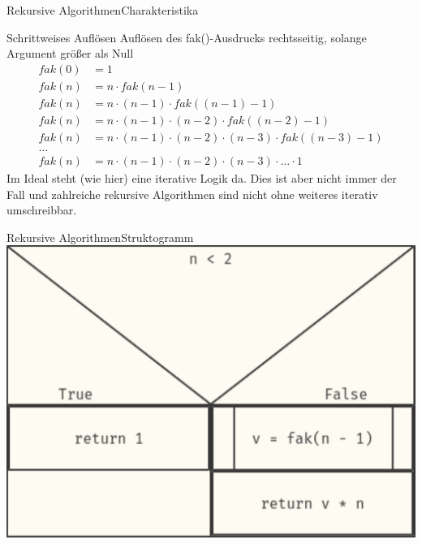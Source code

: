 \documentclass[xelatex,aspectratio=169]{beamer}
\begin{document}
\begin{frame}{Rekursive Algorithmen}{Charakteristika}
  \begin{block}{Schrittweises Auflösen}
    Auflösen des fak()-Ausdrucks rechtsseitig, solange Argument
    größer als  Null
    \begin{align*}
      fak(0) & =1                                                             \\
      fak(n) & = n \cdot fak(n-1)                                             \\
      fak(n) & = n \cdot   (n-1) \cdot fak( (n-1) -1)                         \\
      fak(n) & = n \cdot   (n-1) \cdot (n-2) \cdot fak( (n-2) -1)             \\
      fak(n) & = n \cdot   (n-1) \cdot (n-2) \cdot (n-3) \cdot fak( (n-3) -1) \\
      \ldots                                                                  \\
      fak(n) & = n \cdot   (n-1) \cdot (n-2) \cdot (n-3) \cdot \ldots \cdot 1
    \end{align*}
    Im Ideal steht (wie hier) eine iterative Logik da. Dies ist aber nicht immer der Fall und zahlreiche rekursive Algorithmen sind nicht ohne weiteres iterativ umschreibbar.
  \end{block}
\end{frame}


\begin{frame}{Rekursive Algorithmen}{Struktogramm}
  \centering
  \includegraphics[height=0.8\textheight]{fig/algorithmus_faculty_struktogram.pdf}
\end{frame}
\end{document}
